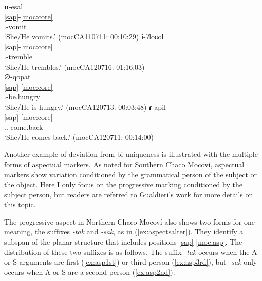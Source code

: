 \documentclass[output=paper]{langscibook}
\begin{document}
\ea \label{ex:manytoone}
\ea \label{ex:manytoone1}
\glll \textbf{n}-esal  \\
    \ref{sap}-\ref{moc:core}\\
      {\Third.\I}-vomit\\
\glt `She/He vomits.'  \hfill (mocCA110711: 00:10:29)
\ex \label{ex:manytoone2}
\glll \textbf{i}-ʔloɢol  \\
    \ref{sap}-\ref{moc:core}\\
      {\Third.\I}-tremble\\
\glt `She/He trembles.'  \hfill (mocCA120716: 01:16:03)\\
\ex \label{ex:manytoone3}
\glll ∅-qopat  \\
    \ref{sap}-\ref{moc:core}\\
      {\Third.\I}-be.hungry\\
\glt `She/He is hungry.'  \hfill (mocCA120713: 00:03:48)
\ex \label{ex:manytoone4}
\glll \textbf{ɾ}-apil  \\
    \ref{sap}-\ref{moc:core}\\
      {\Third.\Intr.\I}-come.back\\
\glt `She/He comes back.'  \hfill (mocCA120711: 00:14:00)
\z
\z

Another example of deviation from bi-uniqueness is illustrated with the multiple forms of aspectual markers. As \citet[246--255]{Gualdieri1998} noted for Southern Chaco Mocoví, aspectual markers show variation conditioned by the grammatical person of the subject or the object. Here I only focus on the progressive marking conditioned by the subject person, but readers are referred to Gualdieri's work for more details on this topic. 

The progressive aspect in Northern Chaco Mocoví also shows two forms for one meaning, the suffixes \textit{-tak} and \textit{-sak}, as in (\ref{ex:aspectsalter}). They identify a subspan of the planar structure that includes positions \ref{sap}-\ref{moc:asp}. The distribution of these two suffixes is as follows. The suffix \textit{-tak} occurs when the A or S arguments are first (\ref{ex:asp1st}) or third person (\ref{ex:asp3rd}), but \textit{-sak} only occurs when A or S are a second person (\ref{ex:asp2nd}).    
\end{document}
